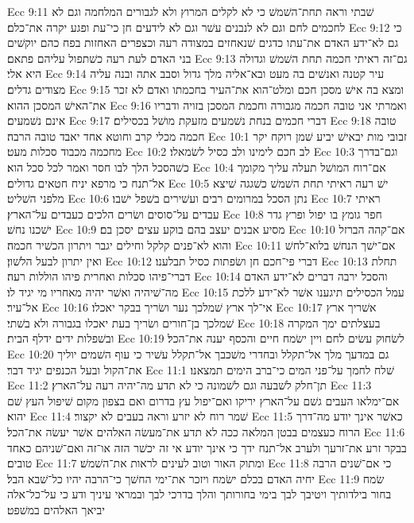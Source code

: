 Ecc 9:11  שׁבתי וראה תחת־השׁמשׁ כי לא לקלים המרוץ ולא לגבורים המלחמה וגם לא לחכמים לחם וגם לא לנבנים עשׁר וגם לא לידעים חן כי־עת ופגע יקרה את־כלם׃
Ecc 9:12  כי גם לא־ידע האדם את־עתו כדגים שׁנאחזים במצודה רעה וכצפרים האחזות בפח כהם יוקשׁים בני האדם לעת רעה כשׁתפול עליהם פתאם׃
Ecc 9:13  גם־זה ראיתי חכמה תחת השׁמשׁ וגדולה היא אלי׃
Ecc 9:14  עיר קטנה ואנשׁים בה מעט ובא־אליה מלך גדול וסבב אתה ובנה עליה מצודים גדלים׃
Ecc 9:15  ומצא בה אישׁ מסכן חכם ומלט־הוא את־העיר בחכמתו ואדם לא זכר את־האישׁ המסכן ההוא׃
Ecc 9:16  ואמרתי אני טובה חכמה מגבורה וחכמת המסכן בזויה ודבריו אינם נשׁמעים׃
Ecc 9:17  דברי חכמים בנחת נשׁמעים מזעקת מושׁל בכסילים׃
Ecc 9:18  טובה חכמה מכלי קרב וחוטא אחד יאבד טובה הרבה׃
Ecc 10:1  זבובי מות יבאישׁ יביע שׁמן רוקח יקר מחכמה מכבוד סכלות מעט׃
Ecc 10:2  לב חכם לימינו ולב כסיל לשׂמאלו׃
Ecc 10:3  וגם־בדרך כשׁהסכל הלך לבו חסר ואמר לכל סכל הוא׃
Ecc 10:4  אם־רוח המושׁל תעלה עליך מקומך אל־תנח כי מרפא יניח חטאים גדולים׃
Ecc 10:5  ישׁ רעה ראיתי תחת השׁמשׁ כשׁגגה שׁיצא מלפני השׁליט׃
Ecc 10:6  נתן הסכל במרומים רבים ועשׁירים בשׁפל ישׁבו׃
Ecc 10:7  ראיתי עבדים על־סוסים ושׂרים הלכים כעבדים על־הארץ׃
Ecc 10:8  חפר גומץ בו יפול ופרץ גדר ישׁכנו נחשׁ׃
Ecc 10:9  מסיע אבנים יעצב בהם בוקע עצים יסכן בם׃
Ecc 10:10  אם־קהה הברזל והוא לא־פנים קלקל וחילים יגבר ויתרון הכשׁיר חכמה׃
Ecc 10:11  אם־ישׁך הנחשׁ בלוא־לחשׁ ואין יתרון לבעל הלשׁון׃
Ecc 10:12  דברי פי־חכם חן ושׂפתות כסיל תבלענו׃
Ecc 10:13  תחלת דברי־פיהו סכלות ואחרית פיהו הוללות רעה׃
Ecc 10:14  והסכל ירבה דברים לא־ידע האדם מה־שׁיהיה ואשׁר יהיה מאחריו מי יגיד לו׃
Ecc 10:15  עמל הכסילים תיגענו אשׁר לא־ידע ללכת אל־עיר׃
Ecc 10:16  אי־לך ארץ שׁמלכך נער ושׂריך בבקר יאכלו׃
Ecc 10:17  אשׁריך ארץ שׁמלכך בן־חורים ושׂריך בעת יאכלו בגבורה ולא בשׁתי׃
Ecc 10:18  בעצלתים ימך המקרה ובשׁפלות ידים ידלף הבית׃
Ecc 10:19  לשׂחוק עשׂים לחם ויין ישׂמח חיים והכסף יענה את־הכל׃
Ecc 10:20  גם במדעך מלך אל־תקלל ובחדרי משׁכבך אל־תקלל עשׁיר כי עוף השׁמים יוליך את־הקול ובעל הכנפים יגיד דבר׃
Ecc 11:1  שׁלח לחמך על־פני המים כי־ברב הימים תמצאנו׃
Ecc 11:2  תן־חלק לשׁבעה וגם לשׁמונה כי לא תדע מה־יהיה רעה על־הארץ׃
Ecc 11:3  אם־ימלאו העבים גשׁם על־הארץ יריקו ואם־יפול עץ בדרום ואם בצפון מקום שׁיפול העץ שׁם יהוא׃
Ecc 11:4  שׁמר רוח לא יזרע וראה בעבים לא יקצור׃
Ecc 11:5  כאשׁר אינך יודע מה־דרך הרוח כעצמים בבטן המלאה ככה לא תדע את־מעשׂה האלהים אשׁר יעשׂה את־הכל׃
Ecc 11:6  בבקר זרע את־זרעך ולערב אל־תנח ידך כי אינך יודע אי זה יכשׁר הזה או־זה ואם־שׁניהם כאחד טובים׃
Ecc 11:7  ומתוק האור וטוב לעינים לראות את־השׁמשׁ׃
Ecc 11:8  כי אם־שׁנים הרבה יחיה האדם בכלם ישׂמח ויזכר את־ימי החשׁך כי־הרבה יהיו כל־שׁבא הבל׃
Ecc 11:9  שׂמח בחור בילדותיך ויטיבך לבך בימי בחורותך והלך בדרכי לבך ובמראי עיניך ודע כי על־כל־אלה יביאך האלהים במשׁפט׃
